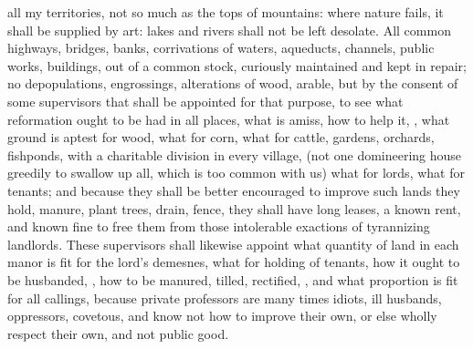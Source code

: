all my territories, not so much as the tops of mountains: where nature fails,
it shall be supplied by art: lakes and rivers shall not be
left desolate. All common highways, bridges, banks, corrivations of waters,
aqueducts, channels, public works, buildings, \etc{} out of a
common stock, curiously maintained and kept in repair; no
depopulations, engrossings, alterations of wood, arable, but by the consent of
some supervisors that shall be appointed for that purpose, to see what
reformation ought to be had in all places, what is amiss, how to help it,
, what ground is
aptest for wood, what for corn, what for cattle, gardens, orchards, fishponds,
\etc{} with a charitable division in every village, (not one domineering house
greedily to swallow up all, which is too common with us) what for lords,
what for tenants; and because they shall be better
encouraged to improve such lands they hold, manure, plant trees, drain, fence,
\etc{} they shall have long leases, a known rent, and known fine to free them
from those intolerable exactions of tyrannizing landlords. These supervisors
shall likewise appoint what quantity of land in each manor is fit for the
lord's demesnes, what for holding of tenants, how it ought
to be husbanded, , how to be manured, tilled, rectified, , and what proportion is fit for all callings, because
private professors are many times idiots, ill husbands, oppressors, covetous,
and know not how to improve their own, or else wholly respect their own, and
not public good.

